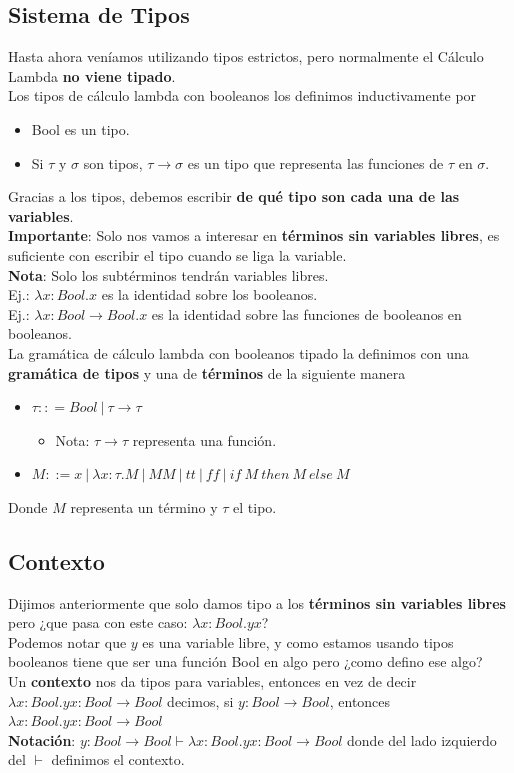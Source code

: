 \documentclass[10pt,a4paper]{article}
\begin{document}
\subsection{Sistema de Tipos}
Hasta ahora veníamos utilizando tipos estrictos, pero normalmente el Cálculo Lambda \textbf{no viene tipado}. \\
Los tipos de cálculo lambda con booleanos los definimos inductivamente por 
\begin{itemize}
    \item Bool es un tipo.
    \item Si $\tau$ y $\sigma$ son tipos, $\tau \rightarrow \sigma$ es un tipo que representa las funciones de $\tau$ en $\sigma$.
\end{itemize}
Gracias a los tipos, debemos escribir \textbf{de qué tipo son cada una de las variables}. \\
\textbf{Importante}: Solo nos vamos a interesar en \textbf{términos sin variables libres}, es suficiente con escribir el tipo cuando se liga la variable. \\
\textbf{Nota}: Solo los subtérminos tendrán variables libres. \\
Ej.: $\lambda x:Bool . x$ es la identidad sobre los booleanos. \\
Ej.: $\lambda x:Bool \rightarrow Bool.x$ es la identidad sobre las funciones de booleanos en booleanos. \\

La gramática de cálculo lambda con booleanos tipado la definimos con una \textbf{gramática de tipos} y una de \textbf{términos} de la siguiente manera
\begin{itemize}
    \item $\tau :: = Bool \ | \ \tau \rightarrow \tau$
    \begin{itemize}
        \item Nota: $\tau \rightarrow \tau$ representa una función.
    \end{itemize}
    \item $M ::= x \ | \ \lambda x: \tau . M \ | \ M M \ | \ tt \ | \ ff \ | \ if \ M \ then \ M \ else \ M$
\end{itemize}
Donde $M$ representa un término y $\tau$ el tipo. \\
\subsection{Contexto}
Dijimos anteriormente que solo damos tipo a los \textbf{términos sin variables libres} pero ¿que pasa con este caso: $\lambda x:Bool.yx$? \\
Podemos notar que $y$ es una variable libre, y como estamos usando tipos booleanos tiene que ser una función Bool en algo pero ¿como defino ese algo? \\
Un \textbf{contexto} nos da tipos para variables, entonces en vez de decir $\lambda x:Bool.yx:Bool \rightarrow Bool$ decimos, si $y:Bool \rightarrow Bool$, entonces $\lambda x:Bool.yx : Bool \rightarrow Bool$ \\
\textbf{Notación}: $y: Bool \rightarrow Bool \vdash \lambda x: Bool.yx : Bool \rightarrow Bool$ donde del lado izquierdo del $\vdash$ definimos el contexto.
\end{document}
